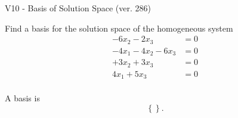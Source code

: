 \begin{exercise}
  \begin{exerciseTitle}V10 - Basis of Solution Space (ver. 286)\end{exerciseTitle}
  \begin{exerciseStatement}
    Find a basis for the solution space of the homogeneous system 
\begin{align*}
 -6 x_ 2 -2 x_ 3 &= 0  \\ 
  -4 x_ 1 -4 x_ 2 -6 x_ 3 &= 0  \\ 
  + 3 x_ 2 + 3 x_ 3 &= 0  \\ 
  4 x_ 1 + 5 x_ 3 &= 0  \\ 
 \end{align*}


 
  \end{exerciseStatement}

  \begin{exerciseAnswer}
   A basis is   
\[\left\{\right\}.\]

  


  \end{exerciseAnswer}
\end{exercise}